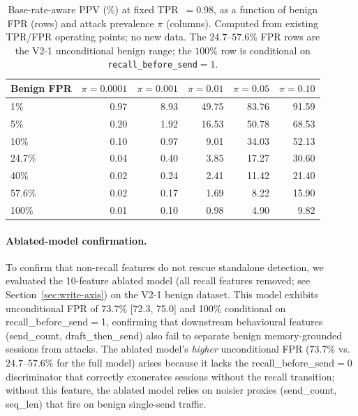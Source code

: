 \documentclass{article}
\begin{document}
\begin{table}[h]
\centering
\small
\caption{Base-rate-aware PPV (\%) at fixed TPR~$= 0.98$, as a function of benign FPR (rows) and attack prevalence $\pi$ (columns). Computed from existing TPR/FPR operating points; no new data. The $24.7$--$57.6\%$ FPR rows are the V2-1 unconditional benign range; the $100\%$ row is conditional on \texttt{recall\_before\_send}${=}1$.}
\label{tab:ppv}
\begin{tabular}{lrrrrr}
\toprule
Benign FPR & $\pi{=}0.0001$ & $\pi{=}0.001$ & $\pi{=}0.01$ & $\pi{=}0.05$ & $\pi{=}0.10$ \\
\midrule
1\%    & 0.97 & 8.93 & 49.75 & 83.76 & 91.59 \\
5\%    & 0.20 & 1.92 & 16.53 & 50.78 & 68.53 \\
10\%   & 0.10 & 0.97 & 9.01  & 34.03 & 52.13 \\
24.7\% & 0.04 & 0.40 & 3.85  & 17.27 & 30.60 \\
40\%   & 0.02 & 0.24 & 2.41  & 11.42 & 21.40 \\
57.6\% & 0.02 & 0.17 & 1.69  & 8.22  & 15.90 \\
100\%  & 0.01 & 0.10 & 0.98  & 4.90  & 9.82  \\
\bottomrule
\end{tabular}
\end{table}

\paragraph{Ablated-model confirmation.} To confirm that non-recall features do not rescue standalone detection, we evaluated the 10-feature ablated model (all recall features removed; see Section~\ref{sec:write-axis}) on the V2-1 benign dataset. This model exhibits unconditional FPR of 73.7\% [72.3, 75.0] and 100\% conditional on recall\_before\_send$=$1, confirming that downstream behavioural features (send\_count, draft\_then\_send) also fail to separate benign memory-grounded sessions from attacks. The ablated model's \emph{higher} unconditional FPR (73.7\% vs.\ $24.7$--$57.6\%$ for the full model) arises because it lacks the recall\_before\_send$=$0 discriminator that correctly exonerates sessions without the recall transition; without this feature, the ablated model relies on noisier proxies (send\_count, seq\_len) that fire on benign single-send traffic.
\end{document}
